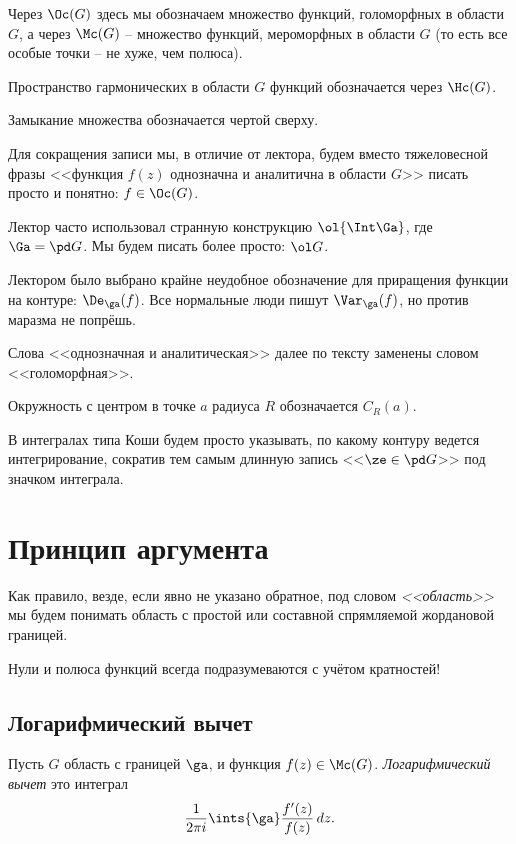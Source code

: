 \documentclass[a4paper]{article}
\def\dz{\,dz}
\begin{document}
\begin{items}{-2}
\item Через $\Oc(G)$ здесь мы обозначаем множество функций, голоморфных в области $G$, а через $\Mc(G)$ -- множество
функций, мероморфных в области $G$ (то есть все особые точки -- не хуже, чем полюса).
\item Пространство гармонических в области $G$ функций обозначается через $\Hc(G)$.
\item Замыкание множества обозначается чертой сверху.
\item Для сокращения записи мы, в отличие от лектора, будем вместо тяжеловесной фразы <<функция $f(z)$
однозначна и аналитична в области $G$>> писать просто и понятно: $f\in \Oc(G)$.
\item Лектор часто использовал странную конструкцию $\ol{\Int \Ga}$, где $\Ga=\pd G$.
Мы будем писать более просто: $\ol G$.
\item Лектором было выбрано крайне неудобное обозначение для приращения функции на контуре: $\De_\ga(f)$.
Все нормальные люди пишут $\Var_\ga(f)$, но против маразма не попрёшь.
\item Слова <<однозначная и аналитическая>> далее по тексту заменены словом <<голоморфная>>.
\item Окружность с центром в точке $a$ радиуса $R$ обозначается $C_R(a)$.
\item В интегралах типа Коши будем просто указывать, по какому контуру ведется интегрирование, сократив тем самым
длинную запись <<$\ze \in \pd G$>> под значком интеграла.
\end{items}

\medskip
\dmvntrail

\pagebreak

\section{Принцип аргумента}

Как правило, везде, если явно не указано обратное, под словом \emph{<<область>>} мы будем понимать
область с простой или составной спрямляемой жордановой границей.

Нули и полюса функций всегда подразумеваются с учётом кратностей!

\subsection{Логарифмический вычет}

\begin{df}
Пусть $G$ область с границей $\ga$, и функция $f(z)\in \Mc(G)$. \emph{Логарифмический вычет} это интеграл
$$\frac{1}{2\pi i}\ints{\ga} \frac{f'(z)}{f(z)}\dz.$$
\end{df}
\end{document}
